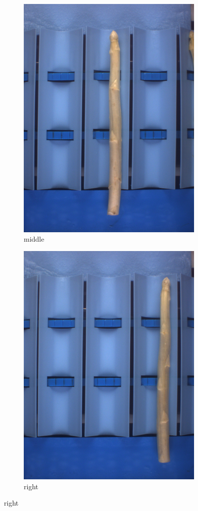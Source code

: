 \begin{figure}[!ht]
\begin{subfigure}{0.3\textwidth}
		\includegraphics[width=0.9\linewidth]{Figures/chapter02/querdel_b.png}
		\caption{middle}
	\end{subfigure}
	\begin{subfigure}{0.3\textwidth}
		\includegraphics[width=0.9\linewidth]{Figures/chapter02/querdel_c.png}
		\caption{right}
	\end{subfigure}
	

\end{figure}
